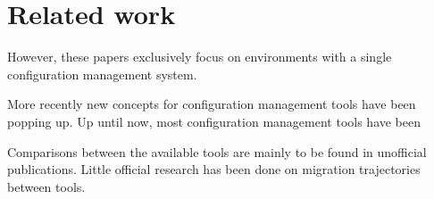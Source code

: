 \section{Related work} \label{related}
However, these papers exclusively focus on environments with a single configuration management system. 

More recently new concepts for configuration management tools have been popping up. Up until now, most configuration management tools have been 

Comparisons between the available tools are mainly to be found in unofficial publications. Little official research has been done on migration trajectories between tools. 
\cite{Hardion2013}
\cite{Collard2015}

